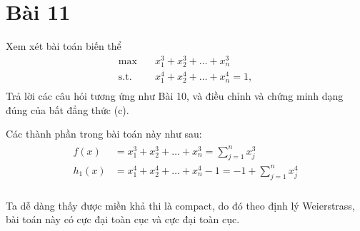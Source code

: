 \section{Bài 11}

Xem xét bài toán biến thể
\begin{equation}
    \begin{aligned}
        \max \quad & x_1^3 + x_2^3 + \dots + x_n^3\\
        \textrm{s.t.} \quad & x_1^4 + x_2^4 + \dots + x_n^4 = 1,\\
    \end{aligned}
\end{equation}
Trả lời các câu hỏi tương ứng như Bài 10, và điều chỉnh và chứng minh dạng đúng của bất đẳng thức (c).

\begin{solution}

    Các thành phần trong bài toán này như sau:
    \begin{align}
        \begin{aligned}
            f(x) &= x_1^3 + x_2^3 + \dots + x_n^3 = \sum_{j=1}^nx_j^3\\
            h_1(x) &= x_1^4 + x_2^4 + \dots + x_n^4 - 1 = -1 + \sum_{j=1}^nx_j^4  \\
        \end{aligned}
    \end{align}

    Ta dễ dàng thấy được miền khả thi là compact, do đó theo định lý Weierstrass, bài toán này có cực đại toàn cục và cực đại toàn cục. 


\end{solution}
